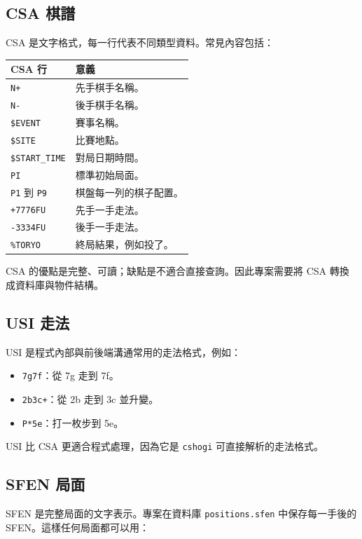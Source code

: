 \documentclass[12pt,a4paper,fontset=none]{ctexart}
\begin{document}
\subsection{CSA 棋譜}

CSA 是文字格式，每一行代表不同類型資料。常見內容包括：

\begin{longtable}{p{}p{}}
\toprule
\textbf{CSA 行} & \textbf{意義}\\
\midrule
\endhead
\texttt{N+} & 先手棋手名稱。\\
\texttt{N-} & 後手棋手名稱。\\
\texttt{\$EVENT} & 賽事名稱。\\
\texttt{\$SITE} & 比賽地點。\\
\texttt{\$START\_TIME} & 對局日期時間。\\
\texttt{PI} & 標準初始局面。\\
\texttt{P1} 到 \texttt{P9} & 棋盤每一列的棋子配置。\\
\texttt{+7776FU} & 先手一手走法。\\
\texttt{-3334FU} & 後手一手走法。\\
\texttt{\%TORYO} & 終局結果，例如投了。\\
\bottomrule
\end{longtable}

CSA 的優點是完整、可讀；缺點是不適合直接查詢。因此專案需要將 CSA 轉換成資料庫與物件結構。

\subsection{USI 走法}

USI 是程式內部與前後端溝通常用的走法格式，例如：

\begin{itemize}
  \item \texttt{7g7f}：從 7g 走到 7f。
  \item \texttt{2b3c+}：從 2b 走到 3c 並升變。
  \item \texttt{P*5e}：打一枚步到 5e。
\end{itemize}

USI 比 CSA 更適合程式處理，因為它是 \texttt{cshogi} 可直接解析的走法格式。

\subsection{SFEN 局面}

SFEN 是完整局面的文字表示。專案在資料庫 \texttt{positions.sfen} 中保存每一手後的 SFEN。這樣任何局面都可以用：
\end{document}
